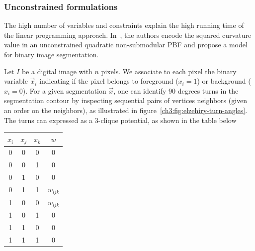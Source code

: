 \subsubsection{Unconstrained formulations}

The high number of variables and constraints explain the high running time of the linear programming approach. In~\cite{zehiry10fast}, the authors encode the squared curvature value in an unconstrained quadratic non-submodular PBF and propose a model for binary image segmentation.

Let $I$ be a digital image with $n$ pixels. We associate to each pixel the binary variable $\vec{x}_i$ indicating if the pixel belongs to foreground ($x_i=1$) or background ($x_i=0$). For a given segmentation $\vec{x}$, one can identify $90$ degrees turns in the segmentation contour by inspecting sequential pairs of vertices neighbors (given an order on the neighbors), as illustrated in figure~\cref{ch3:fig:elzehiry-turn-angles}. The turns can expressed as a $3$-clique potential, as shown in the table below

\begin{center}
\begin{tabular}{|c|c|c|c|}
\hline
$x_i$ & $x_j$ & $x_k$ & $w$ \\
\hline 
0 & 0 & 0 & 0 \\
0 & 0 & 1 & 0 \\
0 & 1 & 0 & 0 \\
0 & 1 & 1 & $w_{ijk}$ \\
1 & 0 & 0 & $w_{ijk}$ \\
1 & 0 & 1 & 0 \\
1 & 1 & 0 & 0 \\
1 & 1 & 1 & 0 \\
\hline 
\end{tabular}
\end{center}

